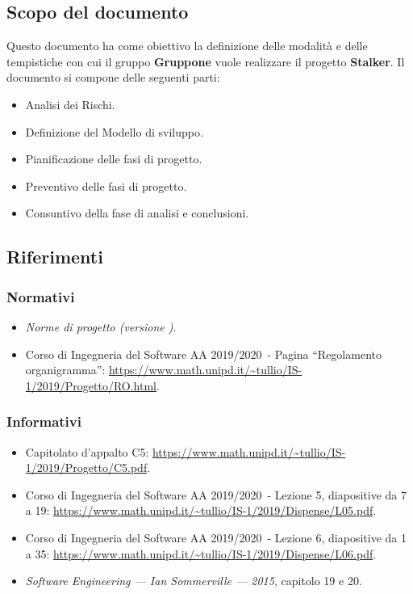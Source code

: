 \documentclass[../piano-di-progetto.tex]{subfiles}
\begin{document}
\subsection{Scopo del documento}%
\label{sub:scopo_del_documento}
Questo documento ha come obiettivo la definizione delle modalità e delle tempistiche con cui il gruppo \textbf{Gruppone} vuole realizzare il progetto \textbf{Stalker}.
Il documento si compone delle seguenti parti:
\begin{itemize}
  \item Analisi dei Rischi.
  \item Definizione del Modello di sviluppo.
  \item Pianificazione delle fasi di progetto.
  \item Preventivo delle fasi di progetto.
  \item Consuntivo della fase di analisi e conclusioni.
\end{itemize}

\scopoDelProdottoEGlossario{}

\subsection{Riferimenti}%
\label{sub:riferimenti}
\subsubsection{Normativi}%
\label{subs:normativi}
\begin{itemize}
  \item \textit{Norme di progetto (versione \versione)}.
  \item Corso di Ingegneria del Software AA 2019/2020~- Pagina ``Regolamento organigramma'': \href{https://www.math.unipd.it/~tullio/IS-1/2019/Progetto/RO.html}{https://www.math.unipd.it/\textasciitilde tullio/IS-1/2019/Progetto/RO.html}. %
\end{itemize}
\subsubsection{Informativi}%
\label{subs:informativi}
\begin{itemize}
  \item Capitolato d'appalto C5: \href{https://www.math.unipd.it/~tullio/IS-1/2019/Progetto/C5.pdf}{https://www.math.unipd.it/\textasciitilde tullio/IS-1/2019/Progetto/C5.pdf}.
  \item Corso di Ingegneria del Software AA 2019/2020~- Lezione 5, diapositive da 7 a 19: \href{https://www.math.unipd.it/~tullio/IS-1/2019/Dispense/L05.pdf}{https://www.math.unipd.it/\textasciitilde tullio/IS-1/2019/Dispense/L05.pdf}.
  \item Corso di Ingegneria del Software AA 2019/2020~- Lezione 6, diapositive da 1 a 35: \href{https://www.math.unipd.it/~tullio/IS-1/2019/Dispense/L06.pdf}{https://www.math.unipd.it/\textasciitilde tullio/IS-1/2019/Dispense/L06.pdf}.
  \item \textit{Software Engineering --- Ian Sommerville --- 2015}, capitolo 19 e 20.
\end{itemize}%
\end{document}

